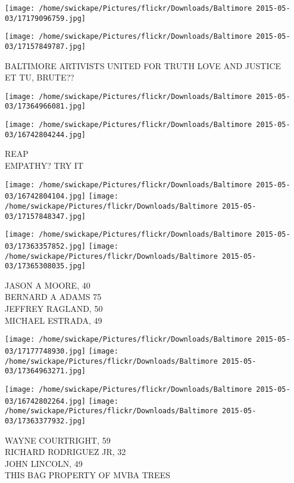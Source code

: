 \documentclass[10pt,letterpaper]{article}
\begin{document}
\texttt{[image: /home/swickape/Pictures/flickr/Downloads/Baltimore 2015-05-03/17179096759.jpg]}

\vspace{0.25in}
\texttt{[image: /home/swickape/Pictures/flickr/Downloads/Baltimore 2015-05-03/17157849787.jpg]}

BALTIMORE ARTIVISTS UNITED FOR TRUTH LOVE AND JUSTICE\\
ET TU, BRUTE??\\
\pagebreak

\texttt{[image: /home/swickape/Pictures/flickr/Downloads/Baltimore 2015-05-03/17364966081.jpg]}

\vspace{0.25in}
\texttt{[image: /home/swickape/Pictures/flickr/Downloads/Baltimore 2015-05-03/16742804244.jpg]}

REAP\\
EMPATHY?  TRY IT\\
\pagebreak

\texttt{[image: /home/swickape/Pictures/flickr/Downloads/Baltimore 2015-05-03/16742804104.jpg]}
\texttt{[image: /home/swickape/Pictures/flickr/Downloads/Baltimore 2015-05-03/17157848347.jpg]}

\texttt{[image: /home/swickape/Pictures/flickr/Downloads/Baltimore 2015-05-03/17363357852.jpg]}
\texttt{[image: /home/swickape/Pictures/flickr/Downloads/Baltimore 2015-05-03/17365308035.jpg]}

JASON A MOORE, 40\\
BERNARD A ADAMS 75\\
JEFFREY RAGLAND, 50\\
MICHAEL ESTRADA, 49\\
\pagebreak

\texttt{[image: /home/swickape/Pictures/flickr/Downloads/Baltimore 2015-05-03/17177748930.jpg]}
\texttt{[image: /home/swickape/Pictures/flickr/Downloads/Baltimore 2015-05-03/17364963271.jpg]}

\texttt{[image: /home/swickape/Pictures/flickr/Downloads/Baltimore 2015-05-03/16742802264.jpg]}
\texttt{[image: /home/swickape/Pictures/flickr/Downloads/Baltimore 2015-05-03/17363377932.jpg]}

WAYNE COURTRIGHT, 59\\
RICHARD RODRIGUEZ JR, 32\\
JOHN LINCOLN, 49\\
THIS BAG PROPERTY OF MVBA TREES\\
\pagebreak
\end{document}
